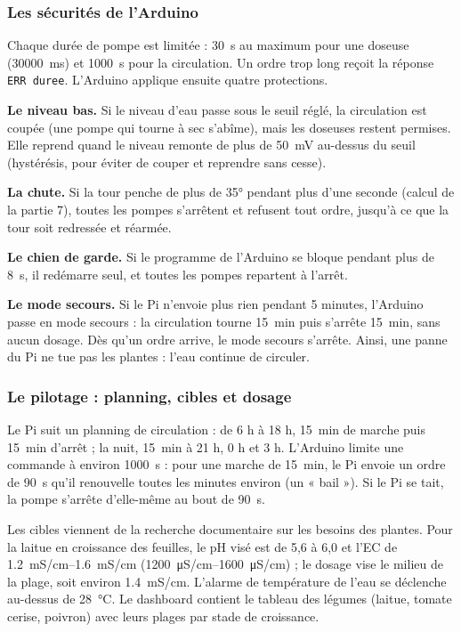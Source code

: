 \subsubsection*{Les sécurités de l'Arduino}

Chaque durée de pompe est limitée : \qty{30}{s} au maximum pour une doseuse (\qty{30000}{ms}) et \qty{1000}{s} pour la circulation. Un ordre trop long reçoit la réponse \texttt{ERR duree}. L'Arduino applique ensuite quatre protections.

\textbf{Le niveau bas.} Si le niveau d'eau passe sous le seuil réglé, la circulation est coupée (une pompe qui tourne à sec s'abîme), mais les doseuses restent permises. Elle reprend quand le niveau remonte de plus de \qty{50}{mV} au-dessus du seuil (hystérésis, pour éviter de couper et reprendre sans cesse).

\textbf{La chute.} Si la tour penche de plus de \ang{35} pendant plus d'une seconde (calcul de la partie 7), toutes les pompes s'arrêtent et refusent tout ordre, jusqu'à ce que la tour soit redressée et réarmée.

\textbf{Le chien de garde.} Si le programme de l'Arduino se bloque pendant plus de \qty{8}{s}, il redémarre seul, et toutes les pompes repartent à l'arrêt.

\textbf{Le mode secours.} Si le Pi n'envoie plus rien pendant 5 minutes, l'Arduino passe en mode secours : la circulation tourne \qty{15}{min} puis s'arrête \qty{15}{min}, sans aucun dosage. Dès qu'un ordre arrive, le mode secours s'arrête. Ainsi, une panne du Pi ne tue pas les plantes : l'eau continue de circuler.

\subsubsection*{Le pilotage : planning, cibles et dosage}

Le Pi suit un planning de circulation : de 6 h à 18 h, \qty{15}{min} de marche puis \qty{15}{min} d'arrêt ; la nuit, \qty{15}{min} à 21 h, 0 h et 3 h. L'Arduino limite une commande à environ \qty{1000}{s} : pour une marche de \qty{15}{min}, le Pi envoie un ordre de \qty{90}{s} qu'il renouvelle toutes les minutes environ (un « bail »). Si le Pi se tait, la pompe s'arrête d'elle-même au bout de \qty{90}{s}.

Les cibles viennent de la recherche documentaire sur les besoins des plantes. Pour la laitue en croissance des feuilles, le pH visé est de 5,6 à 6,0 et l'EC de \qtyrange{1,2}{1,6}{mS/cm} (\qtyrange{1200}{1600}{\micro S/cm}) ; le dosage vise le milieu de la plage, soit environ \qty{1,4}{mS/cm}. L'alarme de température de l'eau se déclenche au-dessus de \qty{28}{\celsius}. Le dashboard contient le tableau des légumes (laitue, tomate cerise, poivron) avec leurs plages par stade de croissance.

